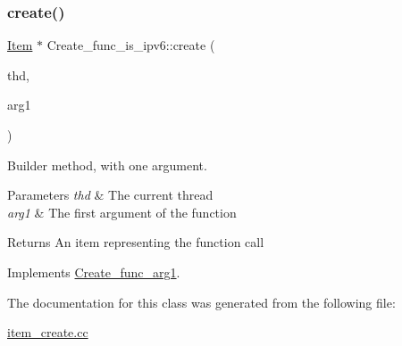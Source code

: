 \subsubsection{\texorpdfstring{create()}{create()}}
{\footnotesize\ttfamily \mbox{\hyperlink{classItem}{Item}} $\ast$ Create\+\_\+func\+\_\+is\+\_\+ipv6\+::create (\begin{DoxyParamCaption}\item[{T\+HD $\ast$}]{thd,  }\item[{\mbox{\hyperlink{classItem}{Item}} $\ast$}]{arg1 }\end{DoxyParamCaption})\hspace{0.3cm}{\ttfamily [virtual]}}

Builder method, with one argument. 
\begin{DoxyParams}{Parameters}
{\em thd} & The current thread \\
\hline
{\em arg1} & The first argument of the function \\
\hline
\end{DoxyParams}
\begin{DoxyReturn}{Returns}
An item representing the function call 
\end{DoxyReturn}


Implements \mbox{\hyperlink{classCreate__func__arg1_a3e9a98f755cd82c3e762e334c955a8c9}{Create\+\_\+func\+\_\+arg1}}.



The documentation for this class was generated from the following file\+:\begin{DoxyCompactItemize}
\item 
\mbox{\hyperlink{item__create_8cc}{item\+\_\+create.\+cc}}\end{DoxyCompactItemize}
